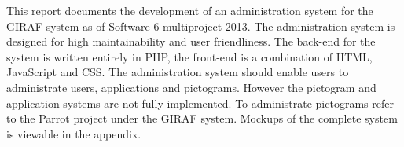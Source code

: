 This report documents the development of an administration system for the GIRAF system as of Software 6 multiproject 2013. The administration system is designed for high maintainability and user friendliness. The back-end for the system is written entirely in PHP, the front-end is a combination of HTML, JavaScript and CSS. The administration system should enable users to administrate users, applications and pictograms. However the pictogram and application systems are not fully implemented. To administrate pictograms refer to the Parrot project under the GIRAF system. Mockups of the complete system is viewable in the appendix.